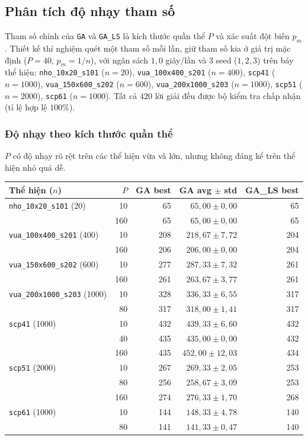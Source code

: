 \subsection{Phân tích độ nhạy tham số}

Tham số chính của \texttt{GA} và \texttt{GA\_LS} là kích thước quần thể $P$ và xác suất đột biến $p_m$. Thiết kế thí nghiệm quét một tham số mỗi lần, giữ tham số kia ở giá trị mặc định ($P=40$, $p_m=1/n$), với ngân sách $1{,}0$ giây/lần và 3 seed ($1,2,3$) trên bảy thể hiện: \texttt{nho\_10x20\_s101} ($n=20$), \texttt{vua\_100x400\_s201} ($n=400$), \texttt{scp41} ($n=1000$), \texttt{vua\_150x600\_s202} ($n=600$), \texttt{vua\_200x1000\_s203} ($n=1000$), \texttt{scp51} ($n=2000$), \texttt{scp61} ($n=1000$). Tất cả $420$ lời giải đều được bộ kiểm tra chấp nhận (tỉ lệ hợp lệ $100\%$).

\subsubsection{Độ nhạy theo kích thước quần thể}

$P$ có độ nhạy rõ rệt trên các thể hiện vừa và lớn, nhưng không đáng kể trên thể hiện nhỏ quá dễ.

\begin{center}
\begin{tabular}{lrrrr}
\hline
Thể hiện ($n$) & $P$ & GA best & GA avg $\pm$ std & GA\_LS best \\
\hline
\texttt{nho\_10x20\_s101} (20) & 10 & 65 & $65{,}00 \pm 0{,}00$ & 65 \\
 & 160 & 65 & $65{,}00 \pm 0{,}00$ & 65 \\
\texttt{vua\_100x400\_s201} (400) & 10 & 208 & $218{,}67 \pm 7{,}72$ & 204 \\
 & 160 & 206 & $206{,}00 \pm 0{,}00$ & 204 \\
\texttt{vua\_150x600\_s202} (600) & 10 & 277 & $287{,}33 \pm 7{,}32$ & 261 \\
 & 160 & 261 & $263{,}67 \pm 3{,}77$ & 261 \\
\texttt{vua\_200x1000\_s203} (1000) & 10 & 328 & $336{,}33 \pm 6{,}55$ & 317 \\
 & 80 & 317 & $318{,}00 \pm 1{,}41$ & 317 \\
\texttt{scp41} (1000) & 10 & 432 & $439{,}33 \pm 6{,}60$ & 432 \\
 & 40 & 435 & $435{,}00 \pm 0{,}00$ & 432 \\
 & 160 & 435 & $452{,}00 \pm 12{,}03$ & 434 \\
\texttt{scp51} (2000) & 10 & 267 & $269{,}33 \pm 2{,}05$ & 253 \\
 & 80 & 256 & $258{,}67 \pm 3{,}09$ & 253 \\
 & 160 & 274 & $276{,}33 \pm 1{,}70$ & 268 \\
\texttt{scp61} (1000) & 10 & 144 & $148{,}33 \pm 4{,}78$ & 140 \\
 & 80 & 141 & $141{,}33 \pm 0{,}47$ & 140 \\
\hline
\end{tabular}
\end{center}

